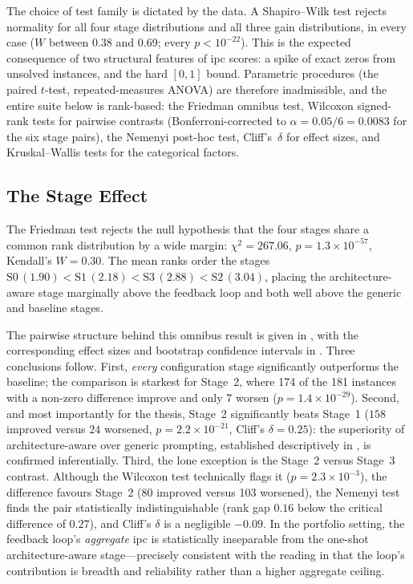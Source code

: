 The choice of test family is dictated by the data. A Shapiro--Wilk test rejects normality for all four stage distributions and all three gain distributions, in every case ($W$ between 0.38 and 0.69; every $p < 10^{-22}$). This is the expected consequence of two structural features of \gls{ipc} scores: a spike of exact zeros from unsolved instances, and the hard $[0,1]$ bound. Parametric procedures (the paired $t$-test, repeated-measures ANOVA) are therefore inadmissible, and the entire suite below is rank-based: the Friedman omnibus test, Wilcoxon signed-rank tests for pairwise contrasts (Bonferroni-corrected to $\alpha = 0.05/6 = 0.0083$ for the six stage pairs), the Nemenyi post-hoc test, Cliff's~$\delta$ for effect sizes, and Kruskal--Wallis tests for the categorical factors.

\subsection{The Stage Effect}
\label{sec:results:statistical_validation:stage}

The Friedman test rejects the null hypothesis that the four stages share a common rank distribution by a wide margin: $\chi^2 = 267.06$, $p = 1.3 \times 10^{-57}$, Kendall's $W = 0.30$. The mean ranks order the stages $\text{S0}\,(1.90) < \text{S1}\,(2.18) < \text{S3}\,(2.88) < \text{S2}\,(3.04)$, placing the architecture-aware stage marginally above the feedback loop and both well above the generic and baseline stages.

The pairwise structure behind this omnibus result is given in , with the corresponding effect sizes and bootstrap confidence intervals in . Three conclusions follow. First, \emph{every} configuration stage significantly outperforms the baseline; the comparison is starkest for Stage~2, where 174 of the 181 instances with a non-zero difference improve and only 7 worsen ($p = 1.4 \times 10^{-29}$). Second, and most importantly for the thesis, Stage~2 significantly beats Stage~1 ($158$ improved versus $24$ worsened, $p = 2.2 \times 10^{-21}$, Cliff's $\delta = 0.25$): the superiority of architecture-aware over generic prompting, established descriptively in , is confirmed inferentially. Third, the lone exception is the Stage~2 versus Stage~3 contrast. Although the Wilcoxon test technically flags it ($p = 2.3 \times 10^{-3}$), the difference favours Stage~2 (80 improved versus 103 worsened), the Nemenyi test finds the pair statistically indistinguishable (rank gap $0.16$ below the critical difference of $0.27$), and Cliff's $\delta$ is a negligible $-0.09$. In the portfolio setting, the feedback loop's \emph{aggregate} \gls{ipc} is statistically inseparable from the one-shot architecture-aware stage---precisely consistent with the reading in  that the loop's contribution is breadth and reliability rather than a higher aggregate ceiling.

